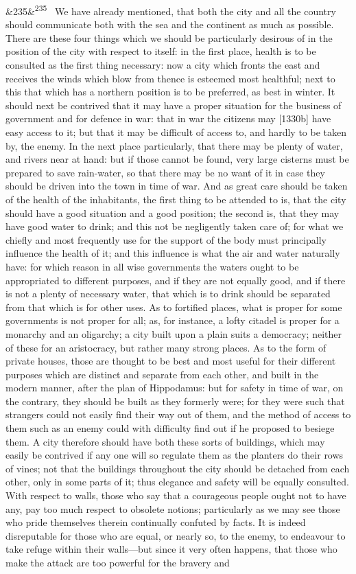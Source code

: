 \documentclass[12pt]{article}
\newcommand{\para}[1][]{\par\noindent\ifx&#1&\else\textsuperscript{\footnotesize #1}~\fi}
\begin{document}
\para[235] We have already mentioned, that both the city and all the country should communicate both with the sea and the continent as much as possible. There are these four things which we should be particularly desirous of in the position of the city with respect to itself: in the first place, health is to be consulted as the first thing necessary: now a city which fronts the east and receives the winds which blow from thence is esteemed most healthful; next to this that which has a northern position is to be preferred, as best in winter. It should next be contrived that it may have a proper situation for the business of government and for defence in war: that in war the citizens may [1330b] have easy access to it; but that it may be difficult of access to, and hardly to be taken by, the enemy. In the next place particularly, that there may be plenty of water, and rivers near at hand: but if those cannot be found, very large cisterns must be prepared to save rain-water, so that there may be no want of it in case they should be driven into the town in time of war. And as great care should be taken of the health of the inhabitants, the first thing to be attended to is, that the city should have a good situation and a good position; the second is, that they may have good water to drink; and this not be negligently taken care of; for what we chiefly and most frequently use for the support of the body must principally influence the health of it; and this influence is what the air and water naturally have: for which reason in all wise governments the waters ought to be appropriated to different purposes, and if they are not equally good, and if there is not a plenty of necessary water, that which is to drink should be separated from that which is for other uses. As to fortified places, what is proper for some governments is not proper for all; as, for instance, a lofty citadel is proper for a monarchy and an oligarchy; a city built upon a plain suits a democracy; neither of these for an aristocracy, but rather many strong places. As to the form of private houses, those are thought to be best and most useful for their different purposes which are distinct and separate from each other, and built in the modern manner, after the plan of Hippodamus: but for safety in time of war, on the contrary, they should be built as they formerly were; for they were such that strangers could not easily find their way out of them, and the method of access to them such as an enemy could with difficulty find out if he proposed to besiege them. A city therefore should have both these sorts of buildings, which may easily be contrived if any one will so regulate them as the planters do their rows of vines; not that the buildings throughout the city should be detached from each other, only in some parts of it; thus elegance and safety will be equally consulted. With respect to walls, those who say that a courageous people ought not to have any, pay too much respect to obsolete notions; particularly as we may see those who pride themselves therein continually confuted by facts. It is indeed disreputable for those who are equal, or nearly so, to the enemy, to endeavour to take refuge within their walls---but since it very often happens, that those who make the attack are too powerful for the bravery and 
\end{document}

